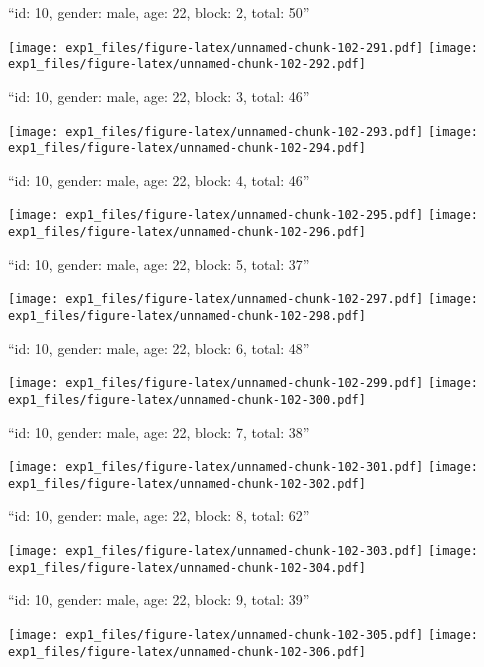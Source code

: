 \documentclass[11pt,,]{article}
\begin{document}
\newpage
[1] 

``id: 10, gender: male, age: 22, block: 2, total: 50''

\texttt{[image: exp1\_files/figure-latex/unnamed-chunk-102-291.pdf]}
\texttt{[image: exp1\_files/figure-latex/unnamed-chunk-102-292.pdf]}

\newpage
[1] 

``id: 10, gender: male, age: 22, block: 3, total: 46''

\texttt{[image: exp1\_files/figure-latex/unnamed-chunk-102-293.pdf]}
\texttt{[image: exp1\_files/figure-latex/unnamed-chunk-102-294.pdf]}

\newpage
[1] 

``id: 10, gender: male, age: 22, block: 4, total: 46''

\texttt{[image: exp1\_files/figure-latex/unnamed-chunk-102-295.pdf]}
\texttt{[image: exp1\_files/figure-latex/unnamed-chunk-102-296.pdf]}

\newpage
[1] 

``id: 10, gender: male, age: 22, block: 5, total: 37''

\texttt{[image: exp1\_files/figure-latex/unnamed-chunk-102-297.pdf]}
\texttt{[image: exp1\_files/figure-latex/unnamed-chunk-102-298.pdf]}

\newpage
[1] 

``id: 10, gender: male, age: 22, block: 6, total: 48''

\texttt{[image: exp1\_files/figure-latex/unnamed-chunk-102-299.pdf]}
\texttt{[image: exp1\_files/figure-latex/unnamed-chunk-102-300.pdf]}

\newpage
[1] 

``id: 10, gender: male, age: 22, block: 7, total: 38''

\texttt{[image: exp1\_files/figure-latex/unnamed-chunk-102-301.pdf]}
\texttt{[image: exp1\_files/figure-latex/unnamed-chunk-102-302.pdf]}

\newpage
[1] 

``id: 10, gender: male, age: 22, block: 8, total: 62''

\texttt{[image: exp1\_files/figure-latex/unnamed-chunk-102-303.pdf]}
\texttt{[image: exp1\_files/figure-latex/unnamed-chunk-102-304.pdf]}

\newpage
[1] 

``id: 10, gender: male, age: 22, block: 9, total: 39''

\texttt{[image: exp1\_files/figure-latex/unnamed-chunk-102-305.pdf]}
\texttt{[image: exp1\_files/figure-latex/unnamed-chunk-102-306.pdf]}
\end{document}
